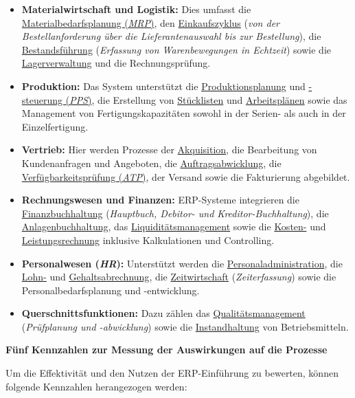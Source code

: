 \begin{itemize}
    \item \textbf{Materialwirtschaft und Logistik:} Dies umfasst die \uline{Materialbedarfsplanung (\textit{\acs{MRP}})}, den \uline{Einkaufszyklus} (\textit{von der Bestellanforderung über die Lieferantenauswahl bis zur Bestellung}), die \uline{Bestandsführung} (\textit{Erfassung von Warenbewegungen in Echtzeit}) sowie die \uline{Lagerverwaltung} und die Rechnungsprüfung. \cite{111}\cite{112}\cite{113}\cite{114}\cite{40}
    \item \textbf{Produktion:} Das System unterstützt die \uline{Produktionsplanung} und \uline{-steuerung (\textit{\acs{PPS}})}, die Erstellung von \uline{Stücklisten} und \uline{Arbeitsplänen} sowie das Management von Fertigungskapazitäten sowohl in der Serien- als auch in der Einzelfertigung. \cite{115}\cite{116}\cite{117}\cite{118}\cite{119}
    \item \textbf{Vertrieb:} Hier werden Prozesse der \uline{Akquisition}, die Bearbeitung von Kundenanfragen und Angeboten, die \uline{Auftragsabwicklung}, die \uline{Verfügbarkeitsprüfung (\textit{\acs{ATP}})}, der Versand sowie die Fakturierung abgebildet. \cite{120}\cite{121}\cite{122}\cite{123}
    \item \textbf{Rechnungswesen und Finanzen:} \acs{ERP}-Systeme integrieren die \uline{Finanzbuchhaltung} (\textit{Hauptbuch, Debitor- und Kreditor-Buchhaltung}), die \uline{Anlagenbuchhaltung}, das \uline{Liquiditätsmanagement} sowie die \uline{Kosten-} und \uline{Leistungsrechnung} inklusive Kalkulationen und Controlling. \cite{56}\cite{124}\cite{125}\cite{126}\cite{127}
    \item \textbf{Personalwesen (\textit{\acs{HR}}):} Unterstützt werden die \uline{Personaladministration}, die \uline{Lohn-} und \uline{Gehaltsabrechnung}, die \uline{Zeitwirtschaft} (\textit{Zeiterfassung}) sowie die Personalbedarfsplanung und -entwicklung. \cite{128}\cite{129}\cite{130}\cite{131}
    \item \textbf{Querschnittsfunktionen:} Dazu zählen das \uline{Qualitätsmanagement} (\textit{Prüfplanung und -abwicklung}) sowie die \uline{Instandhaltung} von Betriebsmitteln. \cite{132}\cite{133}\cite{134}
\end{itemize}
\textbf{Fünf Kennzahlen zur Messung der Auswirkungen auf die Prozesse} \par Um die Effektivität und den Nutzen der \acs{ERP}-Einführung zu bewerten, können folgende Kennzahlen herangezogen werden:
